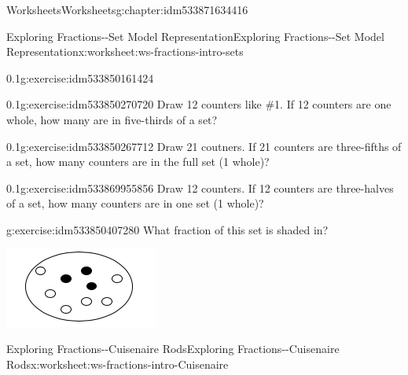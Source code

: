\documentclass[twoside,11pt,]{book}
\begin{document}
\begin{chapterptx}{Worksheets}{}{Worksheets}{}{}{g:chapter:idm533871634416}
\begin{worksheet-section-numberless}{Exploring Fractions-{}-{}Set Model Representation}{}{Exploring Fractions-{}-{}Set Model Representation}{}{}{x:worksheet:ws-fractions-intro-sets}
\begin{divisionexercise}{1}{}{0.1}{g:exercise:idm533850161424}
\begin{sidebyside}{1}{0.35}{0.35}{0}
\begin{sbspanel}{0.3}
\end{sbspanel}%
\end{sidebyside}%
%
\end{divisionexercise}%
\begin{divisionexercise}{2}{}{0.1}{g:exercise:idm533850270720}%
Draw 12 counters like \#1. If 12 counters are one whole, how many are in five-thirds of a set?%
\end{divisionexercise}%
\begin{divisionexercise}{3}{}{0.1}{g:exercise:idm533850267712}%
Draw 21 coutners. If 21 counters are three-fifths of a set, how many counters are in the full set (1 whole)?%
\end{divisionexercise}%
\begin{divisionexercise}{4}{}{0.1}{g:exercise:idm533869955856}%
Draw 12 counters. If 12 counters are three-halves of a set, how many counters are in one set (1 whole)?%
\end{divisionexercise}%
\begin{divisionexercise}{5}{}{}{g:exercise:idm533850407280}%
What fraction of this set is shaded in? \begin{sidebyside}{1}{0.35}{0.35}{0}%
\begin{sbspanel}{0.3}%
\includegraphics[width=1\linewidth]{images/counters-one-third.png}
\end{sbspanel}%
\end{sidebyside}%
%
\end{divisionexercise}%
\end{worksheet-section-numberless}
\restoregeometry
%
%
\typeout{************************************************}
\typeout{************************************************}
%
\begin{worksheet-section-numberless}{Exploring Fractions-{}-{}Cuisenaire Rods}{}{Exploring Fractions-{}-{}Cuisenaire Rods}{}{}{x:worksheet:ws-fractions-intro-Cuisenaire}

\end{worksheet-section-numberless}
\end{chapterptx}
\end{document}
